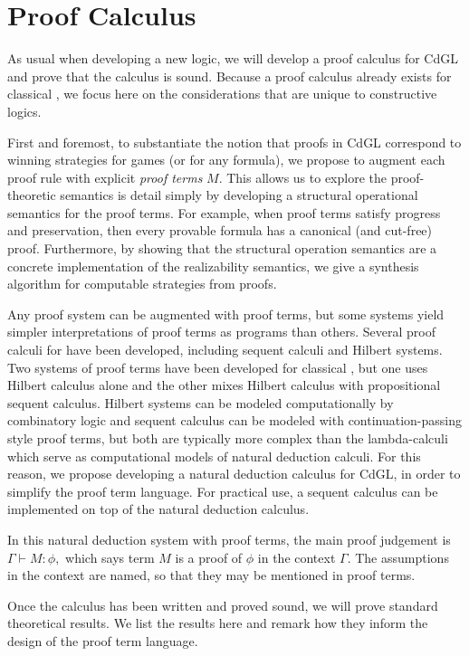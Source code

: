 \documentclass[12pt]{cmuthesis}
\theoremstyle{definition}
\theoremstyle{remark}
\newcommand{\CdGL}{\textsf{CdGL}\xspace}
\begin{document}
\section{Proof Calculus}
\newcommand{\proves}[3]{#1 \vdash #2\mathop{:}#3}
As usual when developing a new logic, we will develop a proof calculus for \CdGL and prove that the calculus is sound.
Because a proof calculus already exists for classical \dGL, we focus here on the considerations that are unique to constructive logics.

First and foremost, to substantiate the notion that proofs in \CdGL correspond to winning strategies for games (or for any formula), we propose to augment each proof rule with explicit \emph{proof terms} $M$.
This allows us to explore the proof-theoretic semantics is detail simply by developing a structural operational semantics for the proof terms.
For example, when proof terms satisfy progress and preservation, then every provable formula has a canonical (and cut-free) proof.
Furthermore, by showing that the structural operation semantics are a concrete implementation of the realizability semantics, we give a synthesis algorithm for computable strategies from proofs.

Any proof system can be augmented with proof terms, but some systems yield simpler interpretations of proof terms as programs than others.
Several proof calculi for \dL have been developed, including sequent calculi and Hilbert systems.
Two systems of proof terms have been developed for classical \dL, but one uses Hilbert calculus alone and the other mixes Hilbert calculus with propositional sequent calculus.
Hilbert systems can be modeled computationally by combinatory logic and sequent calculus can be modeled with continuation-passing style proof terms, but both are typically more complex than the lambda-calculi which serve as computational models of natural deduction calculi.
For this reason, we propose developing a natural deduction calculus for \CdGL, in order to simplify the proof term language.
For practical use, a sequent calculus can be implemented on top of the natural deduction calculus.

In this natural deduction system with proof terms, the main proof judgement is $\proves{\Gamma}{M}{\phi},$ which says term $M$ is a proof of $\phi$ in the context $\Gamma$.
The assumptions in the context are named, so that they may be mentioned in proof terms.

Once the calculus has been written and proved sound, we will prove standard theoretical results.
We list the results here and remark how they inform the design of the proof term language.
\end{document}
